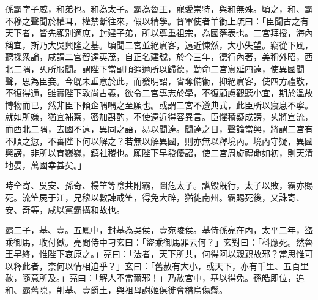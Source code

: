 \begin{pinyinscope}
 
 
 孫霸字子威，和弟也。和為太子。霸為魯王，寵愛崇特，與和無殊。頃之，和、霸不穆之聲聞於權耳，權禁斷往來，假以精學。督軍使者羊衜上疏曰：「臣聞古之有天下者，皆先顯別適庶，封建子弟，所以尊重祖宗，為國藩表也。二宮拜授，海內稱宜，斯乃大吳興隆之基。頃聞二宮並絕賔客，遠近悚然，大小失望。竊從下風，聽採衆論，咸謂二宮智達英茂，自正名建號，於今三年，德行內著，美稱外昭，西北二隅，乆所服聞。謂陛下當副順遐邇所以歸德，勤命二宮賔延四遠，使異國聞聲，思為臣妾。今旣未垂意於此，而發明詔，省奪備衞，抑絕賔客，使四方禮敬，不復得通，雖實陛下敦尚古義，欲令二宮專志於學，不復顧慮觀聽小宜，期於溫故博物而已，然非臣下傾企喁喁之至願也。或謂二宮不遵典式，此臣所以寢息不寧。就如所嫌，猶宜補察，密加斟酌，不使遠近得容異言。臣懼積疑成謗，乆將宣流，而西北二隅，去國不遠，異同之語，易以聞達。聞達之日，聲論當興，將謂二宮有不順之愆，不審陛下何以解之？若無以解異國，則亦無以釋境內。境內守疑，異國興謗，非所以育巍巍，鎮社稷也。願陛下早發優詔，使二宮周旋禮命如初，則天清地晏，萬國幸甚矣。」
 
 
 
 
 時全寄、吳安、孫奇、楊笁等陰共附霸，圖危太子。譖毀旣行，太子以敗，霸亦賜死。流笁屍于江，兄穆以數諫戒笁，得免大辟，猶徙南州。霸賜死後，又誅寄、安、奇等，咸以黨霸搆和故也。
 
 
 
 
 霸二子，基、壹。五鳳中，封基為吳侯，壹宛陵侯。基侍孫亮在內，太平二年，盜乘御馬，收付獄。亮問侍中刁玄曰：「盜乘御馬罪云何？」玄對曰：「科應死。然魯王早終，惟陛下哀原之。」亮曰：「法者，天下所共，何得阿以親親故邪？當思惟可以釋此者，柰何以情相迫乎？」玄曰：「舊赦有大小，或天下，亦有千里、五百里赦，隨意所及。」亮曰：「解人不當爾邪！」乃赦宮中，基以得免。孫皓即位，追和、霸舊隙，削基、壹爵土，與祖母謝姬俱徙會稽烏傷縣。
 
 
\end{pinyinscope}